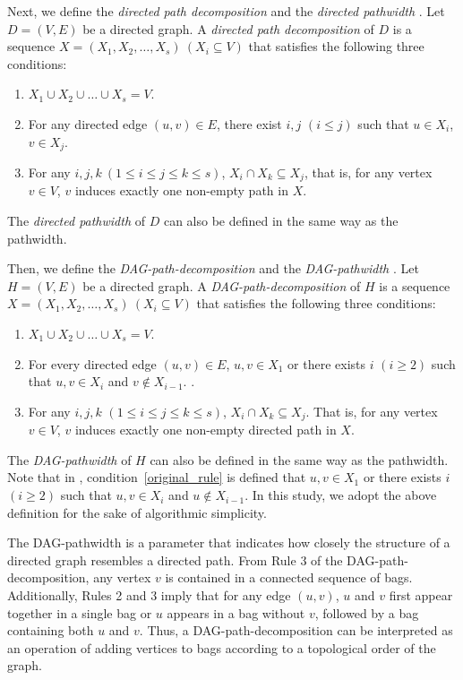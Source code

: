 \documentclass[runningheads]{llncs}
\theoremstyle{plain}
\theoremstyle{definition}
\begin{document}
Next, we define the \emph{directed path decomposition} and the \emph{directed pathwidth} \cite{art9}. Let $D = (V, E)$ be a directed graph. A \emph{directed path decomposition} of $D$ is a sequence $X = (X_1, X_2, \dots, X_s) ~(X_i \subseteq V)$ that satisfies the following three conditions:
\begin{enumerate}
    \item $X_1 \cup X_2 \cup \dots \cup X_s = V$.
    \item For any directed edge $(u, v) \in E$, there exist $i, j$ $(i \leq j)$ such that $u \in X_i$, $v \in X_j$.
    \item For any $i, j, k\ (1 \leq i \leq j \leq k \leq s)$, $X_i \cap X_k \subseteq X_j$, that is, for any vertex $v \in V$, $v$ induces exactly one non-empty path in $X$.
\end{enumerate}

The \emph{directed pathwidth} of $D$ can also be defined in the same way as the pathwidth.

Then, we define the \emph{DAG-path-decomposition} and the \emph{DAG-pathwidth} \cite{art12}. Let $H = (V, E)$ be a directed graph. A \emph{DAG-path-decomposition} of $H$ is a sequence $X = (X_1, X_2, \dots, X_s) ~(X_i \subseteq V)$ that satisfies the following three conditions:
\begin{enumerate}
    \item $X_1 \cup X_2 \cup \dots \cup X_s = V$.
    \item For every directed edge $(u, v) \in E$, $u, v \in X_1$ or there exists $i$ $(i \geq 2)$ such that $u, v \in X_i$ and $v \notin X_{i-1}$. \label{original_rule}.
    \item For any $i, j, k$ $(1 \leq i \leq j \leq k \leq s)$, $X_i \cap X_k \subseteq X_j$. That is, for any vertex $v \in V$, $v$ induces exactly one non-empty directed path in $X$.
\end{enumerate}

The \emph{DAG-pathwidth} of $H$ can also be defined in the same way as the pathwidth. Note that in \cite{art12}, condition~\ref{original_rule} is defined that $u, v \in X_1$ or there exists $i$ $(i \geq 2)$ such that $u, v \in X_i$ and $u \notin X_{i-1}$. In this study, we adopt the above definition for the sake of algorithmic simplicity.

The DAG-pathwidth is a parameter that indicates how closely the structure of a directed graph resembles a directed path. From Rule 3 of the DAG-path-decomposition, any vertex $v$ is contained in a connected sequence of bags. Additionally, Rules 2 and 3 imply that for any edge $(u, v)$, $u$ and $v$ first appear together in a single bag or $u$ appears in a bag without $v$, followed by a bag containing both $u$ and $v$. Thus, a DAG-path-decomposition can be interpreted as an operation of adding vertices to bags according to a topological order of the graph.
\end{document}

